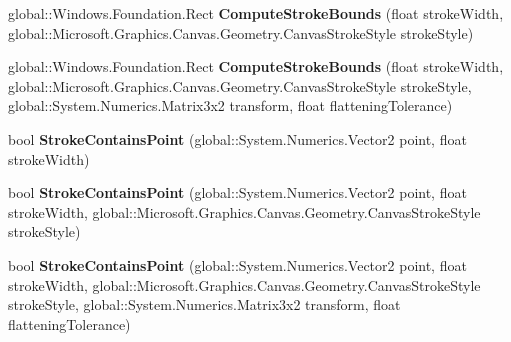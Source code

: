 \begin{DoxyCompactItemize}
\mbox{\label{interface_microsoft_1_1_graphics_1_1_canvas_1_1_geometry_1_1_i_canvas_geometry_a9a080ab4d42be333c23db1f84a78c37b}} 
global\+::\+Windows.\+Foundation.\+Rect {\bfseries Compute\+Stroke\+Bounds} (float stroke\+Width, global\+::\+Microsoft.\+Graphics.\+Canvas.\+Geometry.\+Canvas\+Stroke\+Style stroke\+Style)
\item 
\mbox{\label{interface_microsoft_1_1_graphics_1_1_canvas_1_1_geometry_1_1_i_canvas_geometry_a79b506c76a36146c8bcf102953a9e348}} 
global\+::\+Windows.\+Foundation.\+Rect {\bfseries Compute\+Stroke\+Bounds} (float stroke\+Width, global\+::\+Microsoft.\+Graphics.\+Canvas.\+Geometry.\+Canvas\+Stroke\+Style stroke\+Style, global\+::\+System.\+Numerics.\+Matrix3x2 transform, float flattening\+Tolerance)
\item 
\mbox{\label{interface_microsoft_1_1_graphics_1_1_canvas_1_1_geometry_1_1_i_canvas_geometry_acdb5842e23cf49f65d75966833fcdeda}} 
bool {\bfseries Stroke\+Contains\+Point} (global\+::\+System.\+Numerics.\+Vector2 point, float stroke\+Width)
\item 
\mbox{\label{interface_microsoft_1_1_graphics_1_1_canvas_1_1_geometry_1_1_i_canvas_geometry_a749861cc7df09da3d826703f624d3aa2}} 
bool {\bfseries Stroke\+Contains\+Point} (global\+::\+System.\+Numerics.\+Vector2 point, float stroke\+Width, global\+::\+Microsoft.\+Graphics.\+Canvas.\+Geometry.\+Canvas\+Stroke\+Style stroke\+Style)
\item 
\mbox{\label{interface_microsoft_1_1_graphics_1_1_canvas_1_1_geometry_1_1_i_canvas_geometry_a8c8e0234f10f24e16c5e23af24012c5a}} 
bool {\bfseries Stroke\+Contains\+Point} (global\+::\+System.\+Numerics.\+Vector2 point, float stroke\+Width, global\+::\+Microsoft.\+Graphics.\+Canvas.\+Geometry.\+Canvas\+Stroke\+Style stroke\+Style, global\+::\+System.\+Numerics.\+Matrix3x2 transform, float flattening\+Tolerance)
\item 
\mbox{\label{interface_microsoft_1_1_graphics_1_1_canvas_1_1_geometry_1_1_i_canvas_geometry_a3dc1c0c2642c9d24d0f9bae6c3181968}} 

\end{DoxyCompactItemize}
